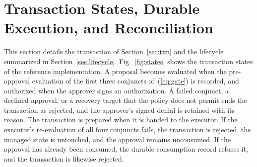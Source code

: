 \section{Transaction States, Durable Execution, and Reconciliation}
\label{s:lifecycle}
This section details the transaction of Section~\ref{sec:txn} and the lifecycle summarized in Section~\ref{sec:lifecycle}. Fig.~\ref{fig:states} shows the transaction states of the reference implementation. A proposal becomes evaluated when the pre-approval evaluation of the first three conjuncts of~(\ref{eq:gate}) is recorded, and authorized when the approver signs an authorization. A failed conjunct, a declined approval, or a recovery target that the policy does not permit ends the transaction as rejected, and the approver's signed denial is retained with its reason. The transaction is prepared when it is handed to the executor. If the executor's re-evaluation of all four conjuncts fails, the transaction is rejected, the managed state is untouched, and the approval remains unconsumed. If the approval has already been consumed, the durable consumption record refuses it, and the transaction is likewise rejected.

